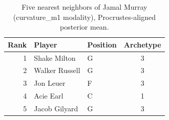 \begin{table}[htbp]
  \centering\small
  \begin{tabular}{rllc}
    \toprule
    Rank & Player & Position & Archetype \\
    \midrule
    1 & Shake Milton & G & 3 \\
    2 & Walker Russell & G & 3 \\
    3 & Jon Leuer & F & 3 \\
    4 & Acie Earl & C & 1 \\
    5 & Jacob Gilyard & G & 3 \\
    \bottomrule
  \end{tabular}
  \caption{Five nearest neighbors of Jamal Murray (curvature_m1 modality), Procrustes-aligned posterior mean.}
  \label{tab:Jamal_Murray_neighbors_curvature_m1}
\end{table}

